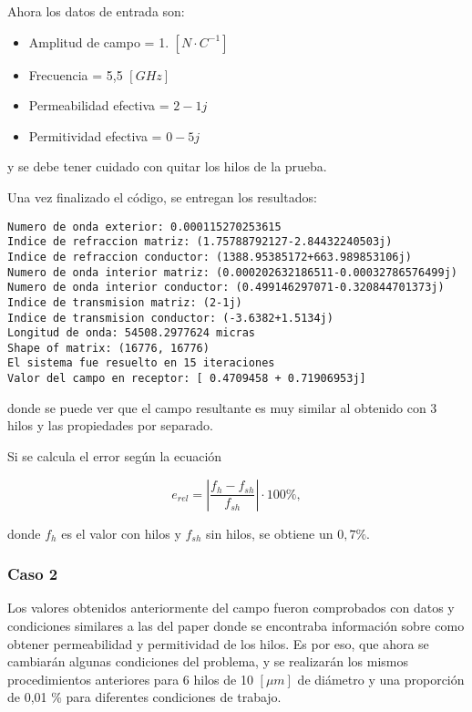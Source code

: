 \documentclass[12pt,letterpaper]{article}
\numberwithin{equation}{section}
\begin{document}
Ahora los datos de entrada son:

\begin{itemize}
	\item Amplitud de campo = 1. $[N \cdotp C^{-1}]$
	\item Frecuencia = 5,5 $[GHz]$
	\item Permeabilidad efectiva = $2-1j$
	\item Permitividad efectiva = $0-5j$
\end{itemize}

\noindent y se debe tener cuidado con quitar los hilos de la prueba.

Una vez finalizado el código, se entregan los resultados:

\begin{lstlisting}
Numero de onda exterior: 0.000115270253615
Indice de refraccion matriz: (1.75788792127-2.84432240503j)
Indice de refraccion conductor: (1388.95385172+663.989853106j)
Numero de onda interior matriz: (0.000202632186511-0.00032786576499j)
Numero de onda interior conductor: (0.499146297071-0.320844701373j)
Indice de transmision matriz: (2-1j)
Indice de transmision conductor: (-3.6382+1.5134j)
Longitud de onda: 54508.2977624 micras
Shape of matrix: (16776, 16776)
El sistema fue resuelto en 15 iteraciones
Valor del campo en receptor: [ 0.4709458 + 0.71906953j]

\end{lstlisting}

\noindent donde se puede ver que el campo resultante es muy similar al obtenido con 3 hilos y las propiedades por separado. 

Si se calcula el error según la ecuación 

\begin{equation}
e_{rel} =| \frac{f_{h}-f_{sh}}{f_{sh}} | \cdot 100 \%,
\end{equation}

\noindent donde $f_{h}$ es el valor con hilos y $f_{sh}$ sin hilos, se obtiene un \textbf{$0,7 \%$}.

\subsubsection{Caso 2}

Los valores obtenidos anteriormente del campo fueron comprobados con datos y condiciones similares a las del paper donde se encontraba información sobre como obtener permeabilidad y permitividad de los hilos. \cite{Wire_theory_2} Es por eso, que ahora se cambiarán algunas condiciones del problema, y se realizarán los mismos procedimientos anteriores para 6 hilos de 10 $[\mu m]$ de diámetro y una proporción de 0,01 \% para diferentes condiciones de trabajo. \cite{Wire_theory_1}
\end{document}
